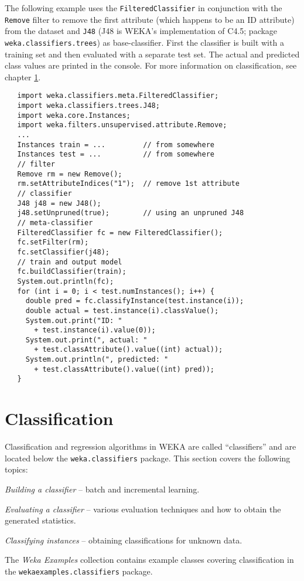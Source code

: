 The following example uses the \texttt{FilteredClassifier} in conjunction with
the \texttt{Remove} filter to remove the first attribute (which happens to be
an ID attribute) from the dataset and \texttt{J48} (J48 is WEKA's
implementation of C4.5; package
\texttt{weka.classifiers.trees}) as base-classifier. First the classifier is
built with a training set and then evaluated with a separate test set. The
actual and predicted class values are printed in the console. For more
information on classification, see chapter \ref{api_classification}.
\begin{verbatim}
   import weka.classifiers.meta.FilteredClassifier;
   import weka.classifiers.trees.J48;
   import weka.core.Instances;
   import weka.filters.unsupervised.attribute.Remove;
   ...
   Instances train = ...         // from somewhere
   Instances test = ...          // from somewhere
   // filter
   Remove rm = new Remove();
   rm.setAttributeIndices("1");  // remove 1st attribute
   // classifier
   J48 j48 = new J48();
   j48.setUnpruned(true);        // using an unpruned J48
   // meta-classifier
   FilteredClassifier fc = new FilteredClassifier();
   fc.setFilter(rm);
   fc.setClassifier(j48);
   // train and output model
   fc.buildClassifier(train);
   System.out.println(fc);
   for (int i = 0; i < test.numInstances(); i++) {
     double pred = fc.classifyInstance(test.instance(i));
     double actual = test.instance(i).classValue();
     System.out.print("ID: "
       + test.instance(i).value(0));
     System.out.print(", actual: "
       + test.classAttribute().value((int) actual));
     System.out.println(", predicted: "
       + test.classAttribute().value((int) pred));
   }
\end{verbatim}

\newpage

\section{Classification}
\label{api_classification}
Classification and regression algorithms in WEKA are called ``classifiers'' and
are located below the \texttt{weka.classifiers} package. This section covers the
following topics:
\begin{tight_itemize}
	\item \textit{Building a classifier} -- batch and incremental learning.
	\item \textit{Evaluating a classifier} -- various evaluation techniques and
how to obtain the generated statistics.
	\item \textit{Classifying instances} -- obtaining classifications for
unknown data.
\end{tight_itemize}
The \textit{Weka Examples} collection\cite{wekaexamples} contains example
classes covering classification in the \texttt{wekaexamples.classifiers}
package.


